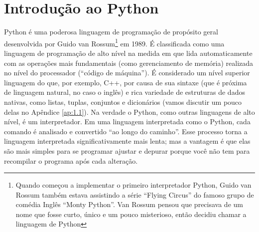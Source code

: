 \chapter{Introdução ao Python}\label{ch:1}

Python é uma poderosa linguagem de programação de propósito geral desenvolvida por Guido van Rossum\footnote{Quando começou a implementar o primeiro interpretador Python, Guido van Rossum também estava assistindo a série ``Flying Circus'' do famoso grupo de comédia Inglês ``Monty Python''. Van Rossum pensou que precisava de um nome que fosse curto, único e um pouco misterioso, então decidiu chamar a linguagem de Python} em 1989.  É classificada como uma linguagem de programação de alto nível na medida em que lida automaticamente com as operações mais fundamentais (como gerenciamento de memória) realizada no nível do processador (“código de máquina”). É considerado um nível superior linguagem do que, por exemplo, C++, por causa de sua sintaxe (que é próxima de linguagem natural, no caso o inglês) e rica variedade de estruturas de dados nativas, como listas, tuplas, conjuntos e dicionários (vamos discutir um pouco delas no Apêndice \ref{ap:1.1}). Na verdade o Python, como outras linguagens de alto nível, é um interpretador. Em uma linguagem interpretada como o Python, cada comando é analisado e convertido “ao longo do caminho”. Esse processo torna a linguagem interpretada significativamente mais lenta; mas a vantagem é que elas são mais simples para se programar ajustar e depurar porque você não tem para recompilar o programa após cada alteração.

